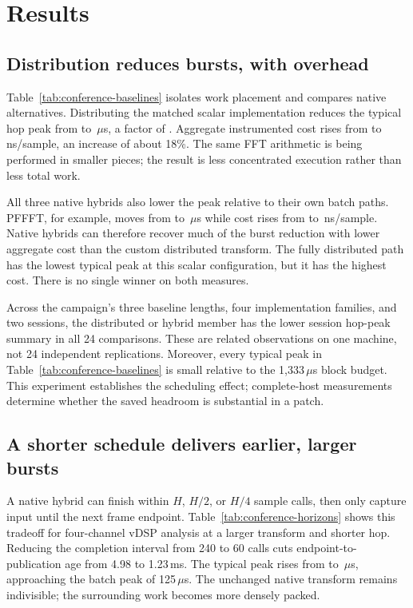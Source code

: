 \section{Results}
\label{sec:results}
\subsection{Distribution reduces bursts, with overhead}
Table~\ref{tab:conference-baselines} isolates work placement and compares
native alternatives. Distributing the matched scalar implementation reduces
the typical hop peak from \StudyBatchPeak{} to
\StudyCorePeak\,$\mu$s, a factor of \StudyPlacementRatio. Aggregate
instrumented cost rises from \StudyBatchCost{} to
\StudyCoreCost\,ns/sample, an increase of about 18\%. The same FFT
arithmetic is being performed in smaller pieces; the result is less
concentrated execution rather than less total work.



All three native hybrids also lower the peak relative to their own batch
paths. PFFFT, for example, moves from \StudyPffftBatchPeak{} to
\StudyPffftHybridPeak\,$\mu$s while cost rises from
\StudyPffftBatchCost{} to \StudyPffftHybridCost\,ns/sample. Native hybrids
can therefore recover much of the burst reduction with lower aggregate cost
than the custom distributed transform. The fully distributed path has the
lowest typical peak at this scalar configuration, but it has the highest
cost. There is no single winner on both measures.

Across the campaign's three baseline lengths, four implementation families,
and two sessions, the distributed or hybrid member has the lower session
hop-peak summary in all 24 comparisons. These are related observations on one
machine, not 24 independent replications. Moreover, every typical peak in
Table~\ref{tab:conference-baselines} is small relative to the
1,333\,$\mu$s block budget. This experiment establishes the scheduling
effect; complete-host measurements determine whether the saved headroom is
substantial in a patch.

\subsection{A shorter schedule delivers earlier, larger bursts}
A native hybrid can finish within $H$, $H/2$, or $H/4$ sample calls, then
only capture input until the next frame endpoint. Table~\ref{tab:conference-horizons}
shows this tradeoff for four-channel vDSP analysis at a larger transform and
shorter hop. Reducing the completion interval from 240 to 60 calls cuts
endpoint-to-publication age from 4.98 to 1.23\,ms. The typical peak rises
from \StudyHorizonFullPeak{} to
\StudyHorizonQuarterPeak\,$\mu$s, approaching the batch peak of
125\,$\mu$s. The unchanged native transform remains indivisible; the
surrounding work becomes more densely packed.

